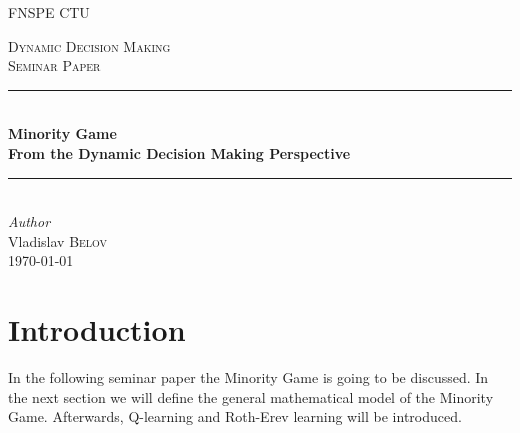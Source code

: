\documentclass[12pt,american,czech]{article}
\begin{document}
\def\documentdate{...}


\begin{titlepage} %
	\newcommand{\HRule}{\rule{\linewidth}{0.5mm}} %
	\center %
	
	\textsc{\LARGE FNSPE CTU}\\[1.5cm] %
	\vfill
	
	\textsc{\Large Dynamic Decision Making}\\[0.5cm] %
	\textsc{\large Seminar Paper}\\[0.5cm] %
	\HRule\\[0.4cm]
	{\huge\bfseries Minority Game}\\
	{\LARGE\bfseries From the Dynamic Decision Making Perspective}\\[0.4cm] %
	\HRule\\[1.5cm]
	{\large\textit{Author}}\\
	Vladislav \textsc{Belov}\\
	\vfill\vfill\vfill\vfill\vfill\vfill\vfill %
	{\large\today} %
	
	
%	
	
	\vfill %
	
\end{titlepage}


\section{Introduction}\label{sec:introduction}

In the following seminar paper the Minority Game is going to be discussed. In the next section we will define the general mathematical model of the Minority Game. Afterwards, Q-learning and Roth-Erev learning will be introduced.
\end{document}
